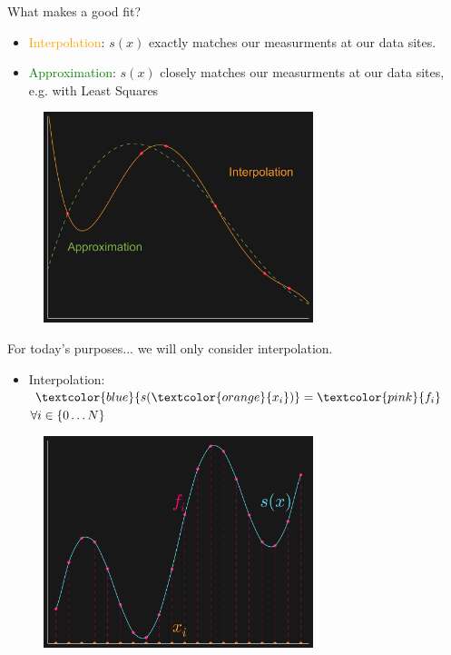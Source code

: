 \documentclass[12pt,t]{beamer}
\newcommand{\bi}{\begin{itemize}}
\newcommand{\ei}{\end{itemize}}
\newcommand{\subt}[1]{{\footnotesize \color{subtitle} {#1}}}
\begin{document}
\begin{frame}{What makes a good fit?}
\bi
\item \textcolor{orange}{Interpolation}: $s(x)$ \subt{exactly matches} our measurments at our data sites. \\ 
\item \textcolor{green}{Approximation}: $s(x)$ \subt{closely matches} our measurments at our data sites, e.g. with Least Squares 
\ei
\begin{figure}
\includegraphics[width=0.7\textwidth, keepaspectratio]{fig2.png}
\end{figure}

\note{}
\end{frame}

\begin{frame}{For today's purposes...}
we will only consider interpolation.

\bi
\item Interpolation: $\textcolor{blue}{s(\textcolor{orange}{x_i})}=\textcolor{pink}{f_i}$ $\forall i\in\{0 \mathellipsis N \}$
\ei
\begin{figure}
\includegraphics[width=0.7\textwidth, keepaspectratio]{fig1.png}
\end{figure}


\note{}
\end{frame}
\end{document}
